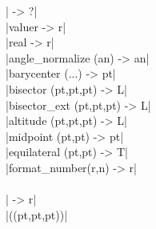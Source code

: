 \documentclass[DIV         = 14,
               fontsize    = 10,
               index       = totoc,
               twoside,
               cadre,
               headings    = small
               ]{tkz-doc}
\begin{document}
\begin{multicols}{3}
|             -> ?|   \\
|value{r}                  -> r|   \\
|real                      -> r|   \\
|angle_normalize (an)      -> an|  \\
|barycenter (...)          -> pt|  \\
|bisector (pt,pt,pt)       -> L|   \\
|bisector_ext (pt,pt,pt)   -> L|   \\
|altitude (pt,pt,pt)       -> L|   \\
|midpoint (pt,pt)          -> pt|  \\
|equilateral (pt,pt)       -> T|   \\
|format_number(r,n)        -> r|   \\

              \\
|              -> r|  \\
|\tkzDrawLuaEllipse((pt,pt,pt))|  \\
\end{multicols}
\end{document}
